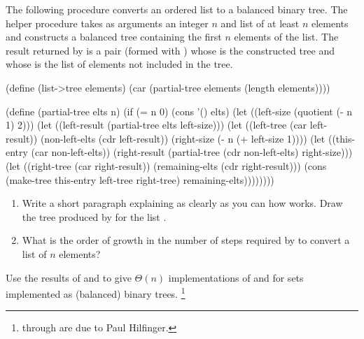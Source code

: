 \begin{exercise}
	\label{Exercise 2.64}
	The following procedure  converts an ordered list to a balanced binary tree.
	The helper procedure  takes as arguments an integer \( n \) and list of at least \( n \) elements and constructs a balanced tree containing the first \( n \) elements of the list.
	The result returned by  is a pair (formed with ) whose  is the constructed tree and whose  is the list of elements not included in the tree.
	\begin{scheme}
	  (define (list->tree elements)
	    (car (partial-tree elements (length elements))))

	  (define (partial-tree elts n)
	    (if (= n 0)
	        (cons '() elts)
	        (let ((left-size (quotient (- n 1) 2)))
	          (let ((left-result
	                 (partial-tree elts left-size)))
	            (let ((left-tree (car left-result))
	                  (non-left-elts (cdr left-result))
	                  (right-size (- n (+ left-size 1))))
	              (let ((this-entry (car non-left-elts))
	                    (right-result
	                     (partial-tree
	                      (cdr non-left-elts)
	                      right-size)))
	                (let ((right-tree (car right-result))
	                      (remaining-elts
	                       (cdr right-result)))
	                  (cons (make-tree this-entry
	                                   left-tree
	                                   right-tree)
	                        remaining-elts))))))))
	\end{scheme}
	\begin{enumerate}[label = \alph*., leftmargin = *]

		\item
			Write a short paragraph explaining as clearly as you can how  works.
			Draw the tree produced by  for the list .

		\item
			What is the order of growth in the number of steps required by  to convert a list of \( n \) elements?

	\end{enumerate}
\end{exercise}



\begin{exercise}
	\label{Exercise 2.65}
	Use the results of  and  to give \( Θ(n) \) implementations of  and  for sets implemented as (balanced) binary trees.%
	\footnote{
		 through  are due to Paul Hilfinger.
	}
\end{exercise}



